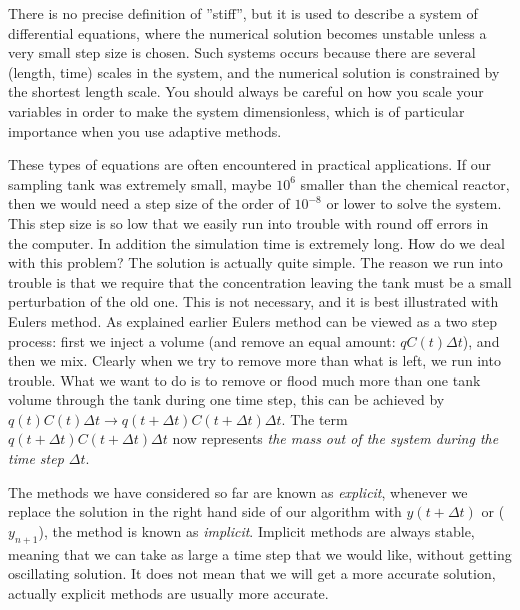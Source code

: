 \documentclass[graybox,sectrefs,envcountresetchap,open=right,final]{svmonodo}
\newenvironment{graybox2admon}[1][]{
\begin{graybox2mdframed}[frametitle=#1]
}
{
\end{graybox2mdframed}
}
\begin{document}
\begin{graybox2admon}[Stiff equations]
There is no precise definition of ''stiff'', but it is used to describe a system of differential equations, where the numerical solution becomes unstable unless
a very small step size is chosen. Such systems occurs because there are several (length, time) scales in the system, and the numerical solution is constrained
by the shortest length scale. You should always be careful on how you scale your variables in order to make the system dimensionless, which is of 
particular importance when you use adaptive methods.
\end{graybox2admon}




These types of equations are often encountered in practical applications. If our sampling tank was extremely small, maybe $10^6$ smaller than the chemical
reactor, then we would need a step size of the order of $10^{-8}$ or lower to solve the system. This step size is so low that we easily run into trouble
with round off errors in the computer. In addition the simulation time is extremely long.  How do we deal with this problem? The solution is actually
quite simple. The reason we run into trouble is that we require that the concentration leaving the tank must be a small perturbation of the old one.
This is not necessary, and it is best illustrated with Eulers method. As explained earlier Eulers method can be viewed as a two step process:
first we inject a volume (and remove an equal amount: $qC(t)\Delta t$), and then we mix. Clearly when we try to remove more than what is left, we run into
trouble. What we want to do is to remove or flood much more than one tank volume through the tank during one time step, this can be achieved by
$q(t)C(t)\Delta t\to q(t+\Delta t)C(t+\Delta t)\Delta t$. The term $q(t+\Delta t)C(t+\Delta t)\Delta t$ now represents
\emph{the mass out of the system during the time step $\Delta t$}.

The methods we have considered so far are known as \emph{explicit}, whenever we replace the solution in the right hand side of our algorithm with $y(t+\Delta t)$
or ($y_{n+1}$),
the method is known as \emph{implicit}. Implicit methods are always stable, meaning that we can take as large a time step that we would like, without
getting oscillating solution. It does not mean that we will get a more accurate solution, actually explicit methods are usually more accurate.
\end{document}
